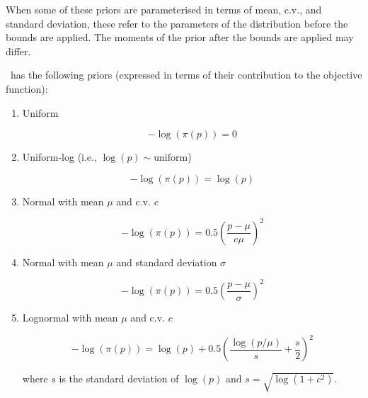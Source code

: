 When some of these priors are parameterised in terms of mean, c.v., and standard deviation, these refer to the parameters of the distribution before the bounds are applied. The moments of the prior after the bounds are applied may differ.

\CNAME\ has the following priors (expressed in terms of their contribution to the objective function):

\begin{enumerate}
\item{Uniform}

\begin{equation}
 - \log \left(\pi \left(p \right) \right) = 0
\end{equation}

\item{Uniform-log} (i.e., $\log(p) \sim \text{uniform}$)

\begin{equation}
 - \log \left(\pi \left(p \right) \right) = \log \left( p \right)
\end{equation}

\item{Normal with mean $\mu$ and c.v. $c$}

\begin{equation}
 - \log \left(\pi \left(p \right) \right) = 0.5\left(\frac{p - \mu}{c\mu} \right)^2
\end{equation}

\item{Normal with mean $\mu$ and standard deviation $\sigma$}

\begin{equation}
 - \log \left(\pi \left(p \right) \right) = 0.5\left(\frac{p - \mu}
{\sigma }\right)^2
\end{equation}

\item{Lognormal with mean $\mu$ and c.v. $c$}

\begin{equation}
 - \log \left(\pi \left(p \right) \right) = \log \left( p \right) + 0.5 \left( \frac{\log \left( p / \mu \right)}{s} + \frac{s}{2} \right)^2
\end{equation}

where $s$ is the standard deviation of $\log(p)$ and $s= \sqrt{\log \left(1+c^2 \right)}$.


\end{enumerate}
